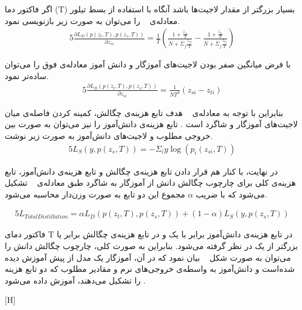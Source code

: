اگر فاکتور دما (T) بسیار بزرگتر از مقدار لاجیت‌ها باشد آنگاه با استفاده از بسط تیلور معادله‌ی ~ را می‌توان به صورت زیر بازنویسی نمود.
\begin{alignat}{5}
	\frac{\partial L_D(p(z_t,T), p(z_s,T))}{\partial z_{si}} = \frac{1}{T}(\frac{1+\frac{z_{si}}{T}}{N+\Sigma_j \frac{z_{sj}}{T}} - \frac{1+\frac{z_{ti}}{T}}{N+\Sigma_j \frac{z_{tj}}{T}})    
	\label{gradsimplelddd}
\end{alignat}

با فرض میانگین صفر بودن لاجیت‌های آموزگار و دانش آموز معادله‌ی فوق را می‌توان ساده‌تر نمود.
\begin{alignat}{5}
	\frac{\partial L_D(p(z_t,T), p(z_s,T))}{\partial z_{si}} = \frac{1}{NT^2}(z_{si}-z_{ti})    
	 \label{gradsimpleld}
\end{alignat}

بنابراین با توجه به معادله‌ی ~ هدف تابع هزینه‌ی چگالش، کمینه کردن فاصله‌ی میان لاجیت‌های آموزگار و شاگرد است . تابع هزینه‌ی دانش‌آموز را نیز می‌توان به صورت  بین خروجی مطلوب و لاجیت‌های دانش‌آموز به صورت زیر نوشت.
\begin{alignat}{5}
	L_S(y, p(z_s,T)) = -\Sigma_i y \log(p_i(z_{si},T))    \label{ls} 
\end{alignat}

در نهایت، با کنار هم قرار دادن تابع‌ هزینه‌‌ی چگالش و تابع هزینه‌ی دانش‌آموز، تابع هزینه‌ی کلی برای چارچوب چگالش دانش از آموزگار به شاگرد طبق معادله‌ی ~ تشکیل می‌شود که با ضریب $\alpha$ مجموع این دو تابع به صورت وزن‌دار محاسبه می‌شود.

\begin{alignat}{5}
	L_{TotalDistillation} = \alpha L_D(p(z_t,T), p(z_s,T)) + (1-\alpha) L_S(y, p(z_s,T))   \label{losstotal} 
\end{alignat}

فاکتور دمای T در تابع هزینه‌ی دانش‌آموز برابر با یک و در تابع‌ هزینه‌ی چگالش برابر یا بزرگتر از یک در نظر گرفته می‌شود. بنابراین به صورت کلی، چارچوب چگالش دانش را می‌توان به صورت شکل ~ بیان نمود که در آن، آموزگار یک مدل از پیش آموزش دیده شده‌است و دانش‌آموز به واسطه‌ی خروجی‌های نرم و مقادیر مطلوب که دو تابع هزینه را تشکیل می‌دهند، آموزش داده می‌شود .

[H]



